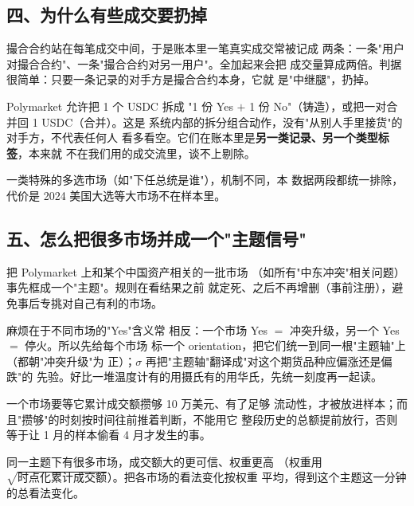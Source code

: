 \subsection{四、为什么有些成交要扔掉}
\begin{description}[style=nextline, leftmargin=1em]
\item[中继腿] 撮合合约站在每笔成交中间，于是账本里一笔真实成交常被记成
  两条：一条"用户对撮合合约"、一条"撮合合约对另一用户"。全加起来会把
  成交量算成两倍。判据很简单：只要一条记录的对手方是撮合合约本身，它就
  是"中继腿"，扔掉。

\item[铸造 / 合并（mint / merge）] Polymarket 允许把 1 个 USDC 拆成
  "1 份 Yes $+$ 1 份 No"（铸造），或把一对合并回 1 USDC（合并）。这是
  系统内部的拆分组合动作，没有"从别人手里接货"的对手方，不代表任何人
  看多看空。它们在账本里是\textbf{另一类记录、另一个类型标签}，本来就
  不在我们用的成交流里，谈不上剔除。

\item[negRisk] 一类特殊的多选市场（如"下任总统是谁"），机制不同，本
  数据两段都统一排除，代价是 2024 美国大选等大市场不在样本里。
\end{description}

\subsection{五、怎么把很多市场并成一个"主题信号"}
\begin{description}[style=nextline, leftmargin=1em]
\item[主题、事前注册] 把 Polymarket 上和某个中国资产相关的一批市场
  （如所有"中东冲突"相关问题）事先框成一个"主题"。规则在看结果之前
  就定死、之后不再增删（事前注册），避免事后专挑对自己有利的市场。

\item[方向系数 orientation 与 $\sigma$] 麻烦在于不同市场的"Yes"含义常
  相反：一个市场 Yes $=$ 冲突升级，另一个 Yes $=$ 停火。所以先给每个市场
  标一个 orientation，把它们统一到同一根"主题轴"上（都朝"冲突升级"为
  正）；$\sigma$ 再把"主题轴"翻译成"对这个期货品种应偏涨还是偏跌"的
  先验。好比一堆温度计有的用摄氏有的用华氏，先统一刻度再一起读。

\item[时点化准入] 一个市场要等它累计成交额攒够 10 万美元、有了足够
  流动性，才被放进样本；而且"攒够"的时刻按时间往前推着判断，不能用它
  整段历史的总额提前放行，否则等于让 1 月的样本偷看 4 月才发生的事。

\item[加权聚合] 同一主题下有很多市场，成交额大的更可信、权重更高
  （权重用$\sqrt{\text{时点化累计成交额}}$）。把各市场的看法变化按权重
  平均，得到这个主题这一分钟的总看法变化。
\end{description}

